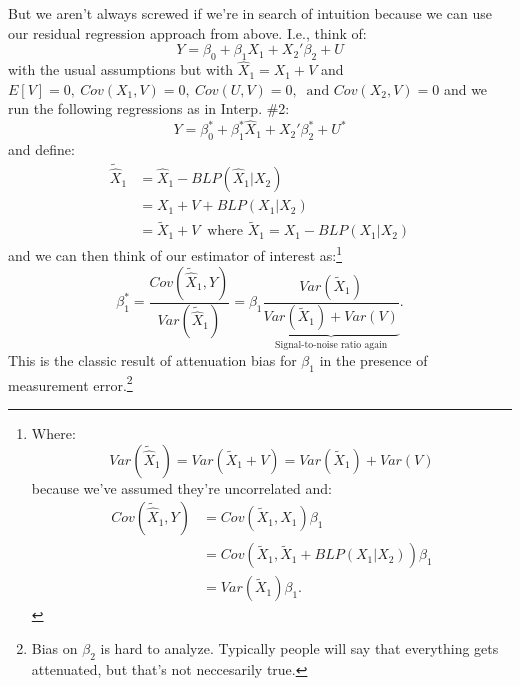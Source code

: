 \documentclass{tufte-book}
\theoremstyle{mytheoremstyle}
\theoremstyle{mylemstyle}
\theoremstyle{mydefstyle}
\begin{document}
But we aren't always screwed if we're in search of intuition because we can use our residual regression approach from above. I.e., think of:
	\[Y = \beta_0 + \beta_1 X_1 + X_2'\beta_2 + U\]
with the usual assumptions but with \(\hat{X}_1 = X_1 + V\) and \(E[V] = 0,\ Cov(X_1, V) = 0,\ Cov(U, V) = 0,\ \text{ and } Cov(X_2, V) = 0\) and we run the following regressions as in Interp. \#2:
	\[Y = \beta_0^* + \beta_1^* \hat{X}_1 + X_2'\beta_2^* + U^*\]
and define:
	\begin{align*}
		\tilde{\hat{X}}_1 & = \hat{X}_1 - BLP(\hat{X}_1 | X_2) \\
					& = X_1 + V + BLP(X_1|X_2)\\
					& = \tilde{X}_1 + V\ \text{ where } \tilde{X}_1 = X_1 - BLP(X_1|X_2)
	\end{align*} 
and we can then think of our estimator of interest as:\footnote{Where: \[Var(\tilde{\hat{X}}_1) = Var(\tilde{X}_1 + V) = Var(\tilde{X}_1) + Var(V)\] 
	because we've assumed they're uncorrelated and:
		\begin{align*}
			Cov(\tilde{\hat{X}}_1, Y) &= Cov(\tilde{X}_1, X_1)\beta_1\\
			&= Cov(\tilde{X}_1, \tilde{X}_1 + BLP(X_1|X_2))\beta_1 \\
			&= Var(\tilde{X}_1)\beta_1 \text{.}
		\end{align*}
	}
	\[\beta_1^* = \frac{Cov(\tilde{\hat{X}}_1, Y)}{Var(\tilde{\hat{X}}_1)} = \beta_1\underbrace{\frac{Var(\tilde{X}_1)}{Var(\tilde{X}_1) + Var(V)}}_\textrm{Signal-to-noise ratio again} \text{.}\]
This is the classic result of attenuation bias for \(\beta_1\) in the presence of measurement error.\footnote{Bias on \(\beta_2\) is hard to analyze. Typically people will say that everything gets attenuated, but that's not neccesarily true.}
\end{document}
